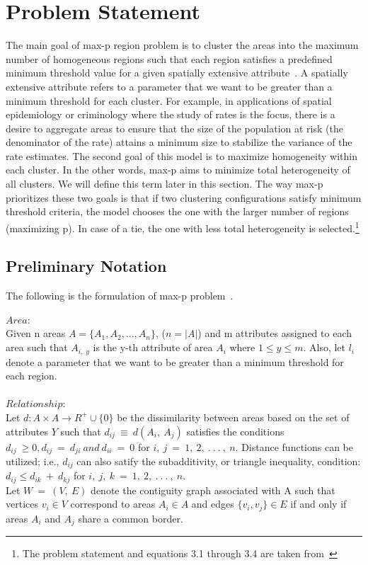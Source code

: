 \documentclass[conference]{IEEEtran}
\begin{document}
\section{Problem Statement}
The main goal of max-p region problem is to cluster the areas into the maximum number of
homogeneous regions such that each region satisfies a predefined minimum
threshold value for a given spatially extensive attribute~\cite{r1}. A spatially extensive
attribute refers to a parameter that we want to be greater than a minimum
threshold for each cluster. For example, in applications of spatial epidemiology
or criminology where the study of rates is the focus, there is a desire to
aggregate areas to ensure that the size of the population at risk (the
denominator of the rate) attains a minimum size to stabilize the variance of the
rate estimates. The second goal of this model is to maximize 
homogeneity within each cluster. In the other words, max-p aims to minimize total
heterogeneity of all clusters. We will define this term later in this section.
The way max-p prioritizes these two goals is that if two clustering
configurations satisfy minimum threshold criteria, the model chooses the one
with the larger number of regions (maximizing p). In case of a tie, the one with less
total heterogeneity is selected.\footnote{The problem statement and equations 3.1 through 3.4 are taken from~\cite{r1}}

\subsection{Preliminary Notation}
The following is the formulation of max-p problem~\cite{r1}.

$Area:$\\
Given n areas $A = \{A_1, A_2, ..., A_n\}$, ($n = |A|$) and m attributes
assigned to each area such that $A_{i,\;y}$ is the y-th attribute of area $A_i$
where $1 \le y \le m$. Also, let $l_i$ denote a parameter that we want to be greater than a minimum
threshold for each region.\\ \\ $Relationship:$\\ Let $d : A \times A \rightarrow R^+ \cup
\{0\}$ be the dissimilarity between areas based on the set of attributes $Y$
such that $d_{ij}\ \equiv \ d(A_i,\ A_j)$ satisfies the conditions $d_{ij}\ \geq
0, d_{ij}\ =\ d_{ji}\ and\ d_{ii}\ =\ 0$ for $i,\ j\ =\ 1,\ 2,\ .\ .\ .\ ,\ n.$
Distance functions can be utilized; i.e., $d_{ij}$ can also satify the
subadditivity, or triangle inequality, condition: $d_{ij} \leq d_{ik}\ +\
d_{kj}$ for $i,\ j,\ k\ =\ 1,\ 2,\ .\ .\ .\ ,\ n.$\\ Let $W\ =\ (V,\ E)$ denote
the contiguity graph associated with A such that vertices $v_i \in V$ correspond
to areas $A_i \in A$ and edges $\{v_i, v_j\} \in E$ if and only if areas $A_i$
and $A_j$ share a common border. \\
 
\end{document}
